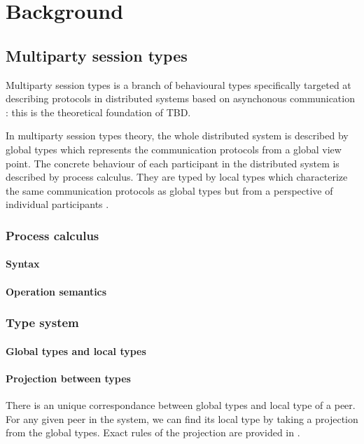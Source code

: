 \chapter{Background}
\section{Multiparty session types} 
Multiparty session types is a branch of behavioural types specifically targeted at describing protocols in distributed systems based on asynchonous communication \cite{coppoGentleIntroductionMultiparty2015}: this is the theoretical foundation of TBD.

In multiparty session types theory, the whole distributed system is described by global types which represents the communication protocols from a global view point. The concrete behaviour of each participant in the distributed system is described by process calculus. They are typed by local types which characterize the same communication protocols as global types but from a perspective of individual participants \cite{coppoGentleIntroductionMultiparty2015}. 
\subsection{Process calculus}
\subsubsection{Syntax}
\subsubsection{Operation semantics}
\subsection{Type system}
\subsubsection{Global types and local types}
\subsubsection{Projection between types}
There is an unique correspondance between global types and local type of a peer. For any given peer in the system, we can find its local type by taking a projection from the global types. Exact rules of the projection are provided in \cite{coppoGentleIntroductionMultiparty2015}.

